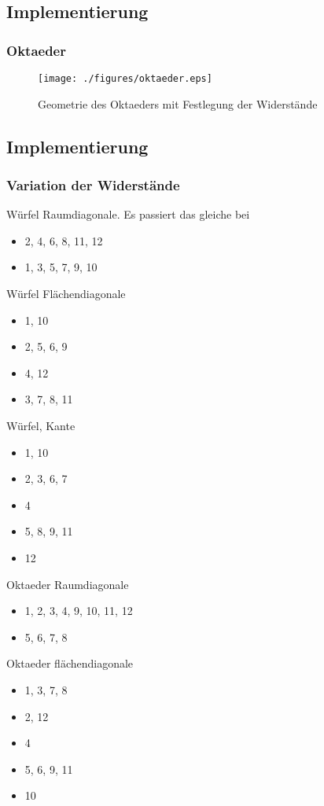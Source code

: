 \documentclass[10pt,a4paper]{article}
\begin{document}
\subsection{Implementierung}

\subsubsection{Oktaeder}
\begin{figure}[htbp!]
\centering
\texttt{[image: ./figures/oktaeder.eps]}
\caption{Geometrie des Oktaeders mit Festlegung der Widerstände}
\label{fig:geometrie_oktaeder}
\end{figure}
\subsection{Implementierung}
\subsubsection{Variation der Widerstände}

Würfel Raumdiagonale. Es passiert das gleiche bei
\begin{itemize}
\item 2, 4, 6, 8, 11, 12
\item 1, 3, 5, 7, 9, 10
\end{itemize}
Würfel Flächendiagonale
\begin{itemize}
\item 1, 10
\item 2, 5, 6, 9
\item 4, 12
\item 3, 7, 8, 11
\end{itemize}
Würfel, Kante
\begin{itemize}
\item 1, 10
\item 2, 3, 6, 7
\item 4
\item 5, 8, 9, 11
\item 12
\end{itemize}
Oktaeder Raumdiagonale
\begin{itemize}
\item 1, 2, 3, 4, 9, 10, 11, 12
\item 5, 6, 7, 8
\end{itemize}
Oktaeder flächendiagonale
\begin{itemize}
\item 1, 3, 7, 8
\item 2, 12
\item 4
\item 5, 6, 9, 11
\item 10
\end{itemize}
\end{document}
